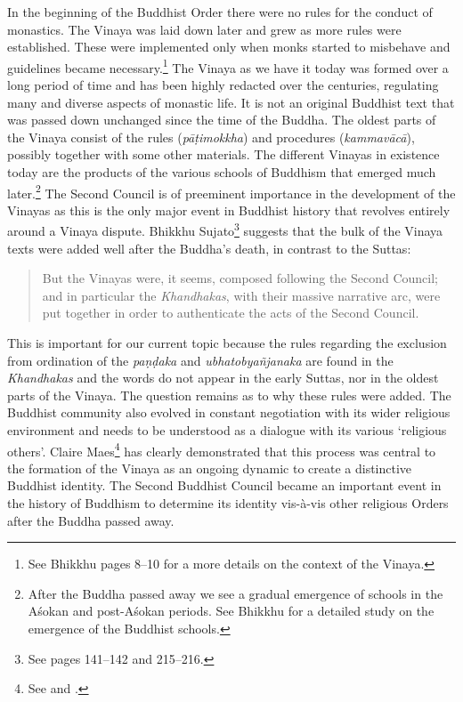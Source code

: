 In the beginning of the Buddhist Order there were no rules for the conduct of monastics. The Vinaya was laid down later and grew as more rules were established. These were implemented only when monks started to misbehave and guidelines became necessary.\footnote{See Bhikkhu \cite{sujato2009} pages 8–10 for a more details on the context of the Vinaya.} The Vinaya as we have it today was formed over a long period of time and has been highly redacted over the centuries, regulating many and diverse aspects of monastic life. It is not an original Buddhist text that was passed down unchanged since the time of the Buddha. The oldest parts of the Vinaya consist of the rules ({\em pāṭimokkha}) and procedures ({\em kammavācā}), possibly together with some other materials. The different Vinayas in existence today are the products of the various schools of Buddhism that emerged much later.\footnote{After the Buddha passed away we see a gradual emergence of schools in the Aśokan and post-Aśokan periods. See Bhikkhu \cite{sujato2012} for a detailed study on the emergence of the Buddhist schools.} The Second Council is of preeminent importance in the development of the Vinayas as this is the only major event in Buddhist history that revolves entirely around a Vinaya dispute. Bhikkhu Sujato\footnote{See \cite{sujato2009} pages 141–142 and 215–216.} suggests that the bulk of the Vinaya texts were added well after the Buddha's death, in contrast to the Suttas: 

\begin{quote}
But the Vinayas were, it seems, composed following the Second Council; and in particular the {\em Khandhakas}, with their massive narrative arc, were put together in order to authenticate the acts of the Second Council.
\end{quote}

This is important for our current topic because the rules regarding the exclusion from ordination of the {\em paṇḍaka} and {\em ubhatob­yañ­janaka} are found in the {\em Khandhakas} and the words do not appear in the early Suttas, nor in the oldest parts of the Vinaya. The question remains as to why these rules were added. The Buddhist community also evolved in constant negotiation with its wider religious environment and needs to be understood as a dialogue with its various `religious others'. Claire Maes\footnote{See \cite{maes} and \cite{maes2016}.} has clearly demonstrated that this process was central to the formation of the Vinaya as an ongoing dynamic to create a distinctive Buddhist identity. The Second Buddhist Council became an important event in the history of Buddhism to determine its identity vis-à-vis other religious Orders after the Buddha passed away.

